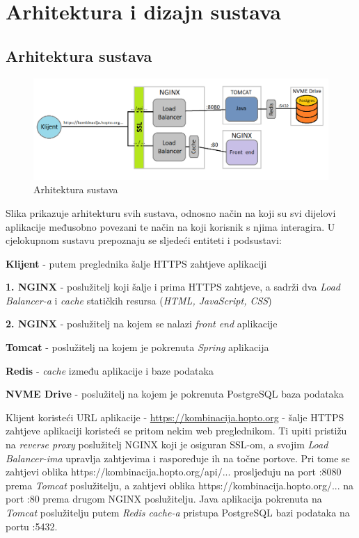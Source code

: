 \chapter{Arhitektura i dizajn sustava}

		\section{Arhitektura sustava}
		\begin{figure}[H]
			\includegraphics[scale=0.5]{figures/system-architecture.png}
			\centering
			\caption{Arhitektura sustava}
			\label{fig:sys-arch}
		\end{figure}
	
		Slika prikazuje arhitekturu svih sustava, odnosno način na koji su svi dijelovi aplikacije međusobno povezani te način na koji korisnik s njima interagira.
		U cjelokupnom sustavu prepoznaju se sljedeći entiteti i podsustavi:
		\begin{packed_item}
			\item \textbf{Klijent} - putem preglednika šalje HTTPS zahtjeve aplikaciji
			\item \textbf{1. NGINX} - poslužitelj koji šalje i prima HTTPS zahtjeve, a sadrži dva \textit{Load Balancer-a} i \textit{cache} statičkih resursa (\textit{HTML, JavaScript, CSS})
			\item \textbf{2. NGINX} - poslužitelj na kojem se nalazi \textit{front end} aplikacije
			\item \textbf{Tomcat} - poslužitelj na kojem je pokrenuta \textit{Spring} aplikacija
			\item \textbf{Redis} - \textit{cache} između aplikacije i baze podataka
			\item \textbf{NVME Drive} - poslužitelj na kojem je pokrenuta PostgreSQL baza podataka
		\end{packed_item}
	
		Klijent koristeći URL aplikacije - \url{https://kombinacija.hopto.org} - šalje HTTPS zahtjeve aplikaciji koristeći se pritom nekim web preglednikom. Ti upiti pristižu na \textit{reverse proxy} poslužitelj NGINX koji je osiguran SSL-om, a svojim \textit{Load Balancer-ima} upravlja zahtjevima i raspoređuje ih na točne portove. Pri tome se zahtjevi oblika https://kombinacija.hopto.org/api/... prosljeđuju na port :8080 prema \textit{Tomcat} poslužitelju, a zahtjevi oblika https://kombinacija.hopto.org/... na port :80 prema drugom NGINX poslužitelju.
		Java aplikacija pokrenuta na \textit{Tomcat} poslužitelju putem \textit{Redis cache-a} pristupa PostgreSQL bazi podataka na portu :5432.
		
